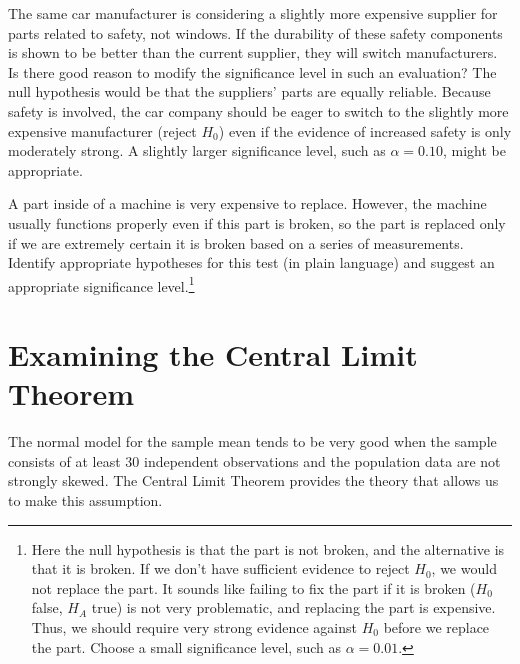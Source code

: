 \begin{example}{The same car manufacturer is considering a slightly more expensive supplier for parts related to safety, not windows. If the durability of these safety components is shown to be better than the current supplier, they will switch manufacturers. Is there good reason to modify the significance level in such an evaluation?}
The null hypothesis would be that the suppliers' parts are equally reliable. Because safety is involved, the car company should be eager to switch to the slightly more expensive manufacturer (reject $H_0$) even if the evidence of increased safety is only moderately strong. A slightly larger significance level, such as $\alpha=0.10$, might be appropriate.
\end{example}

\begin{exercise}
A part inside of a machine is very expensive to replace. However, the machine usually functions properly even if this part is broken, so the part is replaced only if we are extremely certain it is broken based on a series of measurements. Identify appropriate hypotheses for this test (in plain language) and suggest an appropriate significance level.\footnote{Here the null hypothesis is that the part is not broken, and the alternative is that it is broken. If we don't have sufficient evidence to reject $H_0$, we would not replace the part. It sounds like failing to fix the part if it is broken ($H_0$ false, $H_A$ true) is not very problematic, and replacing the part is expensive. Thus, we should require very strong evidence against $H_0$ before we replace the part. Choose a small significance level, such as $\alpha=0.01$.}
\end{exercise}





\section{Examining the Central Limit Theorem}
\label{cltSection}


The normal model for the sample mean tends to be very good when the sample consists of at least 30 independent observations and the population data are not strongly skewed. The Central Limit Theorem provides the theory that allows us to make this assumption.

